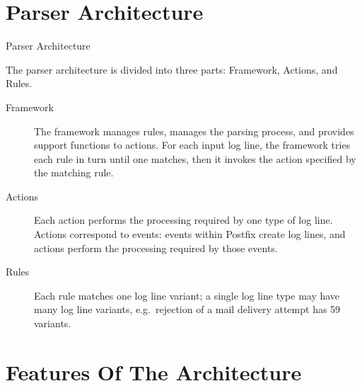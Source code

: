 \documentclass{beamer}
\newcommand{\timingnote}[1]{%
}
\begin{document}
\section{Parser Architecture}

\begin{frame}{Parser Architecture}

    \timingnote{2 minutes}

    The parser architecture is divided into three parts: \newline{}
    Framework, Actions, and Rules.

    \begin{description}

        \item [Framework] The framework manages rules, manages the parsing
            process, and provides support functions to actions.  \newline{}
            For each input log line, the framework tries each rule in turn
            until one matches, then it invokes the action specified by the
            matching rule.

        \item [Actions] Each action performs the processing required by one
            \alert{type} of log line.  Actions correspond to events: events
            within Postfix create log lines, and actions perform the
            processing required by those events.

        \item [Rules] Each rule matches one log line \alert{variant}; a
            single log line \alert{type} may have many log line
            \alert{variants}, e.g.\ rejection of a mail delivery attempt
            has 59 variants.

    \end{description}

\end{frame}

\section{Features Of The Architecture}
\end{document}
